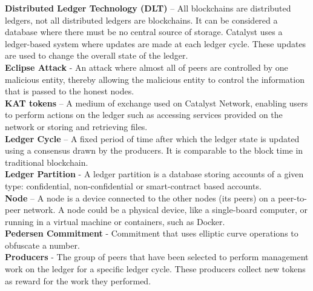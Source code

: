 \textbf{Distributed Ledger Technology (DLT)} – All blockchains are distributed ledgers, not all distributed ledgers are blockchains. It can be considered a database where there must be no central source of storage. Catalyst uses a ledger-based system where updates are made at each ledger cycle. These updates are used to change the overall state of the ledger. \\

\textbf{Eclipse Attack} - An attack where almost all of peers are controlled by one malicious entity, thereby allowing the malicious entity to control the information that is passed to the honest nodes. \\

\textbf{KAT tokens} – A medium of exchange used on Catalyst Network, enabling users to perform actions on the ledger such as accessing services provided on the network or storing and retrieving files. \\

\textbf{Ledger Cycle} – A fixed period of time after which the ledger state is updated using a consensus drawn by the producers. It is comparable to the block time in traditional blockchain. \\

\textbf{Ledger Partition} - A ledger partition is a database storing accounts of a given type: confidential, non-confidential or smart-contract based accounts. \\


\textbf{Node} – A node is a device connected to the other nodes (its peers) on a peer-to-peer network. A node could be a physical device, like a single-board computer, or running in a virtual machine or containers, such as Docker. \\

\textbf{Pedersen Commitment} - Commitment that uses elliptic curve operations to obfuscate a number. \\

\textbf{Producers} - The group of peers that have been selected to perform management work on the ledger for a specific ledger cycle. These producers collect new tokens as reward for the work they performed. \\

